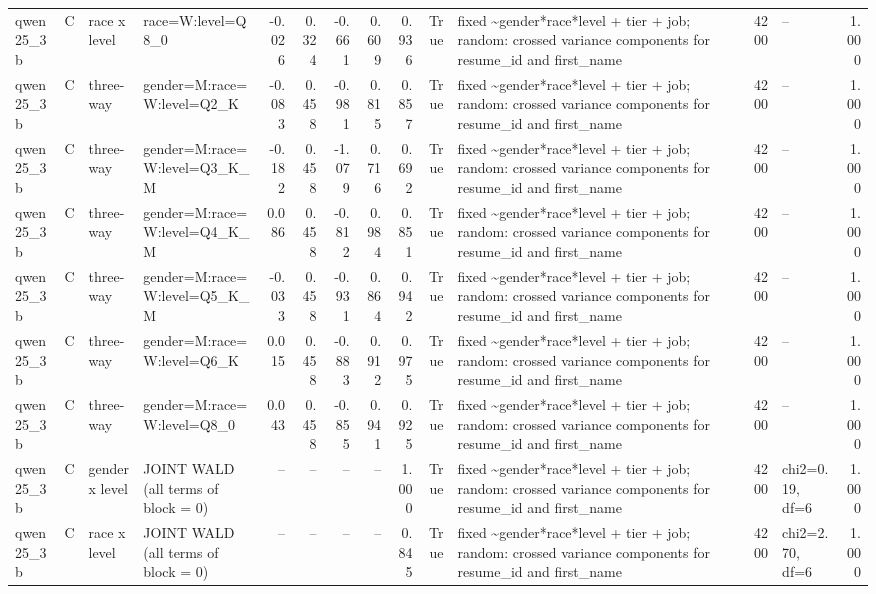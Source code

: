 \begin{tabular}{llllrrrrrrlrlr}
qwen25\_3b & C & race x level & race=W:level=Q8\_0 & -0.026 & 0.324 & -0.661 & 0.609 & 0.936 & True & fixed \textasciitilde \space gender*race*level + tier + job; random: crossed variance components for resume\_id and first\_name & 4200 & -- & 1.000 \\
qwen25\_3b & C & three-way & gender=M:race=W:level=Q2\_K & -0.083 & 0.458 & -0.981 & 0.815 & 0.857 & True & fixed \textasciitilde \space gender*race*level + tier + job; random: crossed variance components for resume\_id and first\_name & 4200 & -- & 1.000 \\
qwen25\_3b & C & three-way & gender=M:race=W:level=Q3\_K\_M & -0.182 & 0.458 & -1.079 & 0.716 & 0.692 & True & fixed \textasciitilde \space gender*race*level + tier + job; random: crossed variance components for resume\_id and first\_name & 4200 & -- & 1.000 \\
qwen25\_3b & C & three-way & gender=M:race=W:level=Q4\_K\_M & 0.086 & 0.458 & -0.812 & 0.984 & 0.851 & True & fixed \textasciitilde \space gender*race*level + tier + job; random: crossed variance components for resume\_id and first\_name & 4200 & -- & 1.000 \\
qwen25\_3b & C & three-way & gender=M:race=W:level=Q5\_K\_M & -0.033 & 0.458 & -0.931 & 0.864 & 0.942 & True & fixed \textasciitilde \space gender*race*level + tier + job; random: crossed variance components for resume\_id and first\_name & 4200 & -- & 1.000 \\
qwen25\_3b & C & three-way & gender=M:race=W:level=Q6\_K & 0.015 & 0.458 & -0.883 & 0.912 & 0.975 & True & fixed \textasciitilde \space gender*race*level + tier + job; random: crossed variance components for resume\_id and first\_name & 4200 & -- & 1.000 \\
qwen25\_3b & C & three-way & gender=M:race=W:level=Q8\_0 & 0.043 & 0.458 & -0.855 & 0.941 & 0.925 & True & fixed \textasciitilde \space gender*race*level + tier + job; random: crossed variance components for resume\_id and first\_name & 4200 & -- & 1.000 \\
qwen25\_3b & C & gender x level & JOINT WALD (all terms of block = 0) & -- & -- & -- & -- & 1.000 & True & fixed \textasciitilde \space gender*race*level + tier + job; random: crossed variance components for resume\_id and first\_name & 4200 & chi2=0.19, df=6 & 1.000 \\
qwen25\_3b & C & race x level & JOINT WALD (all terms of block = 0) & -- & -- & -- & -- & 0.845 & True & fixed \textasciitilde \space gender*race*level + tier + job; random: crossed variance components for resume\_id and first\_name & 4200 & chi2=2.70, df=6 & 1.000 \\

\end{tabular}
